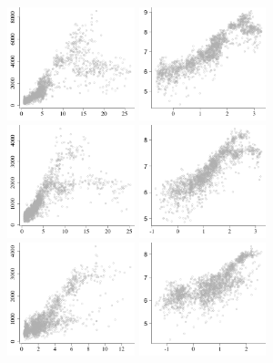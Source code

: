 \begin{figure}
\centering
   \includegraphics[width=0.33\textwidth]{figures/astro_data/1}
   \includegraphics[width=0.33\textwidth]{figures/astro_data/1_log}
   \includegraphics[width=0.33\textwidth]{figures/astro_data/2}
   \includegraphics[width=0.33\textwidth]{figures/astro_data/2_log}
   \includegraphics[width=0.33\textwidth]{figures/astro_data/3}
   \includegraphics[width=0.33\textwidth]{figures/astro_data/3_log}

\end{figure}
